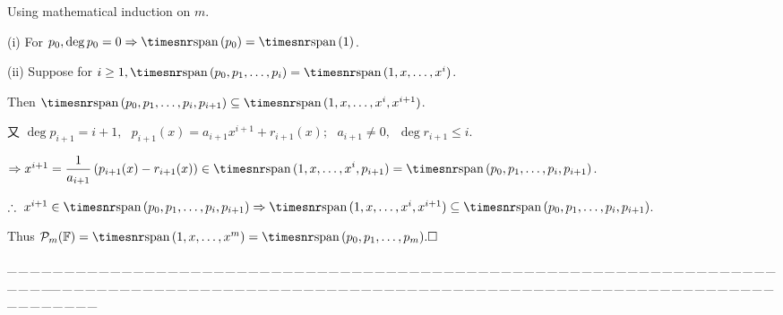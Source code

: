\documentclass[a4paper, 11pt, UTF8]{article}
\def\Spn{{\timesnr\textup{span}}\,}
\def\Endi{\hspace{-2.5pt}}
\def\Hi{\quad\hspace{6.5pt}}
\def\ProblemEnding{{\tiny \_\,\_\,\_\,\_\,\_\,\_\,\_\,\_\,\_\,\_\,\_\,\_\,\_\,\_\,\_\,\_\,\_\,\_\,\_\,\_\,\_\,\_\,\_\,\_\,\_\,\_\,\_\,\_\,\_\,\_\,\_\,\_\,\_\,\_\,\_\,\_\,\_\,\_\,\_\,\_\,\_\,\_\,\_\,\_\,\_\,\_\,\_\,\_\,\_\,\_\,\_\,\_\,\_\,\_\,\_\,\_\,\_\,\_\,\_\,\_\,\_\,\_\,\_\,\_\,\_\,\_\,\_\,\_\,\_\,\_\,\_\_\,\_\,\_\,\_\,\_\,\_\,\_\,\_\,\_\,\_\,\_\,\_\,\_\,\_\,\_\,\_\,\_\,\_\,\_\,\_\,\_\,\_\,\_\,\_\,\_\,\_\,\_\,\_\,\_\,\_\,\_\,\_\,\_\,\_\,\_\,\_\,\_\,\_\,\_\,\_\,\_\,\_\,\_\,\_\,\_\,\_\,\_\,\_\,\_\,\_\,\_\,\_\,\_\,\_\,\_\,\_\,\_\,\_\,\_\,\_\,\_\,\_\,\_\,\_\,\_\,\_\,\_\,\_\,\_\,\_\,\_}}
\begin{document}
\begin{large}
Using mathematical induction on $m$.\par\quad
(i) {For $p_0, \deg p_0=0\Rightarrow\Spn(p_0)=\Spn(1)$.}\par\quad\Endi
(ii) {Suppose for $i\geq 1,\Spn(p_0,p_1,\dots,p_i)=\Spn(1,x,\dots,x^i)$.}\par\quad\Hi
{Then $\Spn(p_0,p_1,\dots,p_i,p_{i+1})\subseteq\Spn(1,x,\dots,x^i,x^{i+1})$.}\par\quad\Hi
又 $\deg p_{i+1}=i+1,\,\,\,\,p_{i+1}(x)=a_{i+1}x^{i+1}+r_{i+1}(x);\,\,\,\,a_{i+1}\neq 0,\,\,\,\deg r_{i+1}\leq i.$
\par\vspace{2pt}\quad\Hi
{$\Rightarrow x^{i+1}=\displaystyle\frac{1}{a_{i+1}}\left(p_{i+1}(x)-r_{i+1}(x)\right)\in\Spn(1,x,\dots,x^i,p_{i+1})=\Spn(p_0,p_1,\dots,p_i,p_{i+1})$.}\par\vspace{2pt}\quad\Hi
{$\therefore\,\,x^{i+1}\in\Spn(p_0,p_1,\dots,p_i,p_{i+1})\Rightarrow\Spn(1,x,\dots,x^i,x^{i+1})\subseteq\Spn(p_0,p_1,\dots,p_i,p_{i+1})$.}\par\quad\Hi
Thus $\PoF{m}=\Spn(1,x,\dots,x^m)=\Spn(p_0,p_1,\dots,p_m).\hfill\square$\par\large
\ProblemEnding\par


\end{large}
\end{document}
